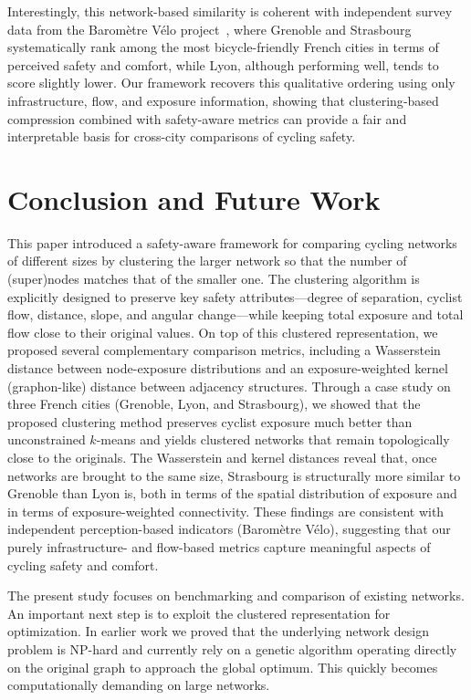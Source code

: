 \documentclass[lettersize,journal]{IEEEtran}
\begin{document}
Interestingly, this network-based similarity is coherent with independent survey data from the Baromètre Vélo project~\cite{parlonsvelo}, where Grenoble and Strasbourg systematically rank among the most bicycle-friendly French cities in terms of perceived safety and comfort, while Lyon, although performing well, tends to score slightly lower.  
Our framework recovers this qualitative ordering using only infrastructure, flow, and exposure information, showing that clustering‐based compression combined with safety-aware metrics can provide a fair and interpretable basis for cross-city comparisons of cycling safety.

\section{Conclusion and Future Work}

This paper introduced a safety-aware framework for comparing cycling networks of different sizes by clustering the larger network so that the number of (super)nodes matches that of the smaller one. The clustering algorithm is explicitly designed to preserve key safety attributes---degree of separation, cyclist flow, distance, slope, and angular change---while keeping total exposure and total flow close to their original values. On top of this clustered representation, we proposed several complementary comparison metrics, including a Wasserstein distance between node-exposure distributions and an exposure-weighted kernel (graphon-like) distance between adjacency structures. Through a case study on three French cities (Grenoble, Lyon, and Strasbourg), we showed that the proposed clustering method preserves cyclist exposure much better than unconstrained $k$-means and yields clustered networks that remain topologically close to the originals. The Wasserstein and kernel distances reveal that, once networks are brought to the same size, Strasbourg is structurally more similar to Grenoble than Lyon is, both in terms of the spatial distribution of exposure and in terms of exposure-weighted connectivity. These findings are consistent with independent perception-based indicators (Baromètre Vélo), suggesting that our purely infrastructure- and flow-based metrics capture meaningful aspects of cycling safety and comfort.

The present study focuses on benchmarking and comparison of existing networks. An important next step is to exploit the clustered representation for optimization. In earlier work \cite{jurado2025graph} we proved that the underlying network design problem is NP-hard and currently rely on a genetic algorithm operating directly on the original graph to approach the global optimum. This quickly becomes computationally demanding on large networks.
\end{document}
